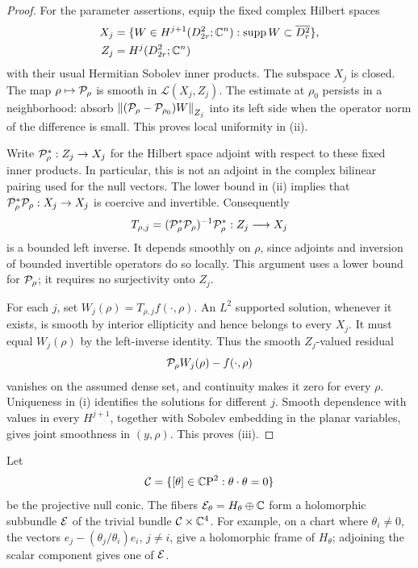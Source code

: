\begin{proof}
For the parameter assertions, equip the fixed complex Hilbert spaces
\[
 \begin{aligned}
 X_j&=\{W\in H^{j+1}(D_{2r}^2;\mathbb C^n):
                  \operatorname{supp} W\subset\overline{D_r^2}\},\\
 Z_j&=H^j(D_{2r}^2;\mathbb C^n)
 \end{aligned}
\]
with their usual Hermitian Sobolev inner products. The subspace $X_j$
is closed. The map $\rho\mapsto\mathcal P_\rho$ is smooth in
$\mathcal L(X_j,Z_j)$. The estimate at $\rho_0$ persists in a
neighborhood: absorb
$\left\lVert (\mathcal P_\rho-\mathcal P_{\rho_0})W\right\rVert_{Z_j}$ into its left side when
the operator norm of the difference is small. This proves local
uniformity in \textup{(ii)}.

Write $\mathcal P_\rho^*:Z_j\to X_j$ for the Hilbert space adjoint with
respect to these fixed inner products. In particular, this is not an
adjoint in the complex bilinear pairing used for the null vectors.
The lower bound in \textup{(ii)} implies that
$\mathcal P_\rho^*\mathcal P_\rho:X_j\to X_j$ is coercive and invertible.
Consequently
\begin{equation}\label{eq:supported-left-inverse}
 T_{\rho,j}
   =(\mathcal P_\rho^*\mathcal P_\rho)^{-1}\mathcal P_\rho^*
       :Z_j\longrightarrow X_j
\end{equation}
is a bounded left inverse. It depends smoothly on $\rho$, since
adjoints and inversion of bounded invertible operators do so locally.
This argument uses a lower bound for $\mathcal P_\rho$; it requires no
surjectivity onto $Z_j$.

For each $j$, set $W_j(\rho)=T_{\rho,j}f(\cdot,\rho)$. An $L^2$
supported solution, whenever it exists, is smooth by interior
ellipticity and hence belongs to every $X_j$. It must equal
$W_j(\rho)$ by the left-inverse identity. Thus the smooth
$Z_j$-valued residual
\[
 \mathcal P_\rho W_j(\rho)-f(\cdot,\rho)
\]
vanishes on the assumed dense set, and continuity makes it zero for
every $\rho$. Uniqueness in \textup{(i)} identifies the solutions for
different $j$. Smooth dependence with values in every $H^{j+1}$,
together with Sobolev embedding in the planar variables, gives joint
smoothness in $(y,\rho)$. This proves \textup{(iii)}.
\end{proof}

Let
\[
 \mathcal C=\{[\theta]\in\mathbb C\mathrm P^2:
                         \theta\cdot\theta=0\}
\]
be the projective null conic. The fibers
$\mathcal E_\theta=H_\theta\oplus\mathbb C$ form a holomorphic subbundle
$\mathcal E$ of the trivial bundle $\mathcal C\times\mathbb C^4$. For example,
on a chart where $\theta_i\ne0$, the vectors
$e_j-(\theta_j/\theta_i)e_i$, $j\ne i$, give a holomorphic frame
of $H_\theta$; adjoining the scalar component gives one of $\mathcal E$.

